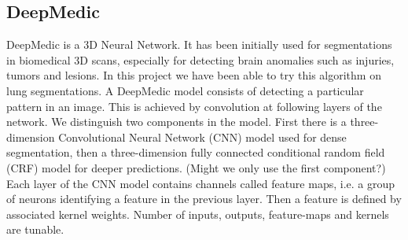 \subsection{DeepMedic}
DeepMedic is a 3D Neural Network. It has been initially used for segmentations in biomedical 3D scans, especially for detecting brain anomalies such as injuries, tumors and lesions. In this project we have been able to try this algorithm on lung segmentations. \newline 
A DeepMedic model consists of detecting a particular pattern in an image. This is achieved by convolution  at  following layers of the network. We distinguish two components in the model. First there is a three-dimension Convolutional Neural Network (CNN) model used for dense segmentation, then  a three-dimension fully connected conditional random field (CRF) model for deeper predictions. (Might we only use the first component?) \newline
Each layer of the CNN model contains channels called feature maps, i.e. a group of neurons identifying a feature in the previous layer. Then a feature is defined by associated kernel weights. Number of inputs, outputs, feature-maps and kernels are tunable.


